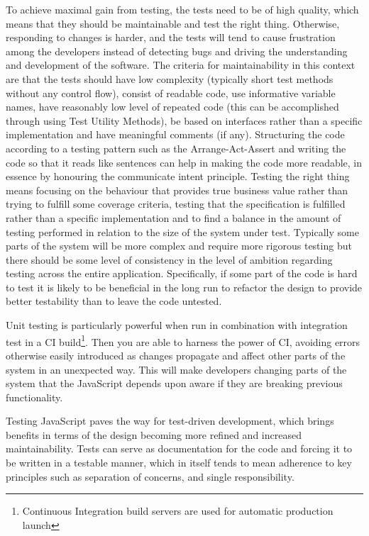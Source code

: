 \documentclass[11pt]{article}
\begin{document}
To achieve maximal gain from testing, the tests need to be of high quality, which means that they should be maintainable and test the right thing. Otherwise, responding to changes is harder, and the tests will tend to cause frustration among the developers instead of detecting bugs and driving the understanding and development of the software\cite{Clean}. The criteria for maintainability in this context are that the tests should have low complexity (typically short test methods without any control flow), consist of readable code, use informative variable names, have reasonably low level of repeated code (this can be accomplished through using Test Utility Methods\cite[599]{TestPatterns}), be based on interfaces rather than a specific implementation and have meaningful comments (if any). Structuring the code according to a testing pattern such as the Arrange-Act-Assert\cite{C2} and writing the code so that it reads like sentences can help in making the code more readable, in essence by honouring the communicate intent principle\cite[p.~41]{TestPatterns}. Testing the right thing means focusing on the behaviour that provides true business value rather than trying to fulfill some coverage criteria, testing that the specification is fulfilled rather than a specific implementation and to find a balance in the amount of testing performed in relation to the size of the system under test. Typically some parts of the system will be more complex and require more rigorous testing but there should be some level of consistency in the level of ambition regarding testing across the entire application. Specifically, if some part of the code is hard to test it is likely to be beneficial in the long run to refactor the design to provide better testability than to leave the code untested.

Unit testing is particularly powerful when run in combination with integration test in a CI build\footnote{Continuous Integration build servers are used for automatic production launch}. Then you are able to harness the power of CI, avoiding errors otherwise easily introduced as changes propagate and affect other parts of the system in an unexpected way. This will make developers changing parts of the system that the JavaScript depends upon aware if they are breaking previous functionality.

Testing JavaScript paves the way for test-driven development, which brings benefits in terms of the design becoming more refined and increased maintainability. Tests can serve as documentation for the code and forcing it to be written in a testable manner, which in itself tends to mean adherence to key principles such as separation of concerns, and single responsibility.
\end{document}
